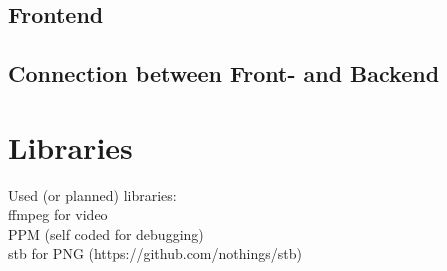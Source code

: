 \documentclass[10pt,a4paper,titlepage]{article}
\begin{document}
	\subsection{Frontend}
	\subsection{Connection between Front- and Backend}
	
	\section{Libraries}
	Used (or planned) libraries:\\
	ffmpeg for video\\
	PPM (self coded for debugging)\\
	stb for PNG (https://github.com/nothings/stb)\\
\end{document}
